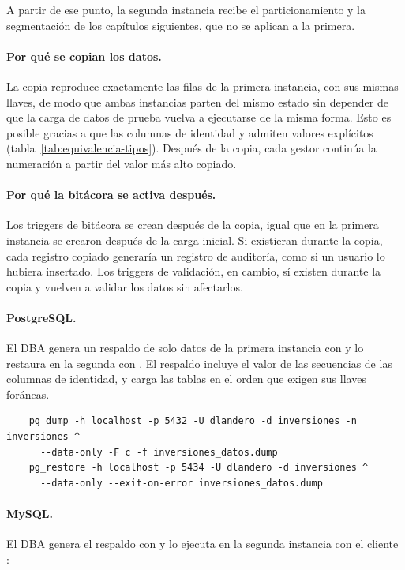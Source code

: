 A partir de ese punto, la segunda instancia recibe el particionamiento y la segmentación de los capítulos siguientes, que no se aplican a la primera.

\paragraph{Por qué se copian los datos.} La copia reproduce exactamente las filas de la primera instancia, con sus mismas llaves, de modo que ambas instancias parten del mismo estado sin depender de que la carga de datos de prueba vuelva a ejecutarse de la misma forma. Esto es posible gracias a que las columnas de identidad y  admiten valores explícitos (tabla~\ref{tab:equivalencia-tipos}). Después de la copia, cada gestor continúa la numeración a partir del valor más alto copiado.

\paragraph{Por qué la bitácora se activa después.} Los triggers de bitácora se crean después de la copia, igual que en la primera instancia se crearon después de la carga inicial. Si existieran durante la copia, cada registro copiado generaría un registro de auditoría, como si un usuario lo hubiera insertado. Los triggers de validación, en cambio, sí existen durante la copia y vuelven a validar los datos sin afectarlos.

\paragraph{PostgreSQL.} El DBA genera un respaldo de solo datos de la primera instancia con  y lo restaura en la segunda con . El respaldo incluye el valor de las secuencias de las columnas de identidad, y  carga las tablas en el orden que exigen sus llaves foráneas.

\begin{verbatim}
	pg_dump -h localhost -p 5432 -U dlandero -d inversiones -n inversiones ^
	  --data-only -F c -f inversiones_datos.dump
	pg_restore -h localhost -p 5434 -U dlandero -d inversiones ^
	  --data-only --exit-on-error inversiones_datos.dump
\end{verbatim}

\paragraph{MySQL.} El DBA genera el respaldo con  y lo ejecuta en la segunda instancia con el cliente :

